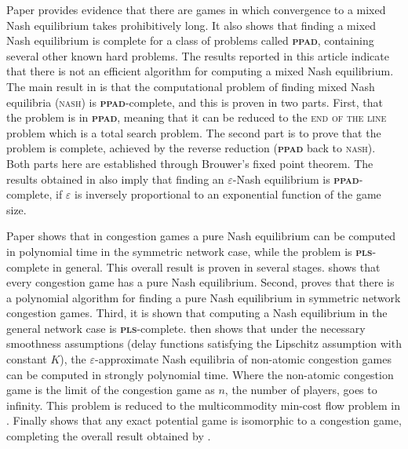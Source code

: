 \documentclass{article}
\begin{document}
Paper \cite{Daskalakis.2009} provides evidence that there are games in which convergence to a mixed Nash equilibrium takes prohibitively long. It also shows that finding a mixed Nash equilibrium is complete for a class of problems called \textbf{\textsc{ppad}}, containing several other known hard problems. The results reported in this article indicate that there is not an efficient algorithm for computing a mixed Nash equilibrium. The main result in \cite{Daskalakis.2009} is that the computational problem of finding mixed Nash equilibria (\textsc{nash}) is \textbf{\textsc{ppad}}-complete, and this is proven in two parts. First, that the problem is in \textbf{\textsc{ppad}}, meaning that it can be reduced to the \textsc{end of the line} problem which is a total search problem. The second part is to prove that the problem is complete, achieved by the reverse reduction (\textbf{\textsc{ppad}} back to \textsc{nash}). Both parts here are established through Brouwer's fixed point theorem. The results obtained in \cite{Daskalakis.2009} also imply that finding an $\varepsilon$-Nash equilibrium is \textbf{\textsc{ppad}}-complete, if $\varepsilon$ is inversely proportional to an exponential function of the game size. 

Paper \cite{Fabrikant.2004} shows that in congestion games a pure Nash equilibrium can be computed in polynomial time in the symmetric network case, while the problem is \textbf{\textsc{pls}}-complete in general. This overall result is proven in several stages. \cite{rosenthal1973class} shows that every congestion game has a pure Nash equilibrium. Second, \cite{Fabrikant.2004} proves that there is a polynomial algorithm for finding a pure Nash equilibrium in symmetric network congestion games. Third, it is shown that computing a Nash equilibrium in the general network case is \textbf{\textsc{pls}}-complete. \cite{Fabrikant.2004} then shows that under the necessary smoothness assumptions (delay functions satisfying the Lipschitz assumption with constant $K$), the $\varepsilon$-approximate Nash equilibria of non-atomic congestion games can be computed in strongly polynomial time. Where the non-atomic congestion game is the limit of the congestion game as $n$, the number of players, goes to infinity. This problem is reduced to the multicommodity min-cost flow problem in \cite{Fabrikant.2004}. Finally \cite{monderer1996potential} shows that any exact potential game is isomorphic to a congestion game, completing the overall result obtained by \cite{Fabrikant.2004}. 
\end{document}
